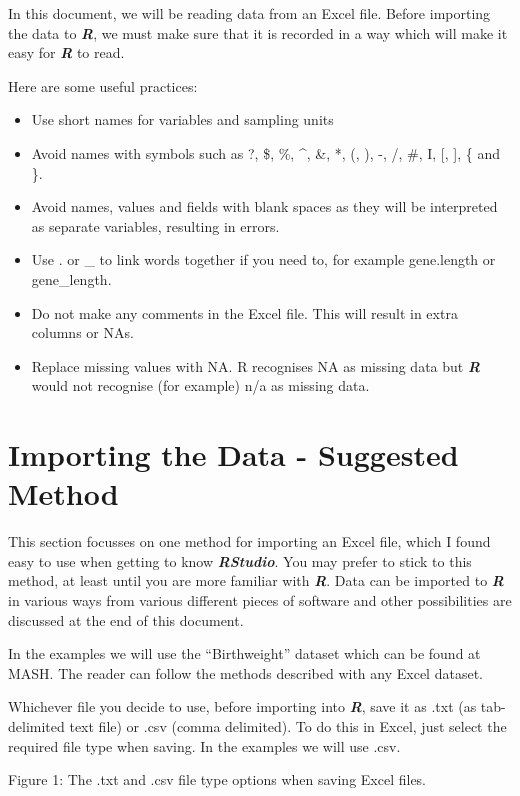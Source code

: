 \documentclass[
]{book}
\providecommand{\tightlist}{%
  \setlength{\itemsep}{0pt}\setlength{\parskip}{0pt}}
\begin{document}
In this document, we will be reading data from an Excel file. Before importing the data to \textbf{\emph{R}}, we must make sure that it is recorded in a way which will make it easy for \textbf{\emph{R}} to read.

Here are some useful practices:

\begin{itemize}
\tightlist
\item
  Use short names for variables and sampling units
\item
  Avoid names with symbols such as ?, \$, \%, \^{}, \&, *, (, ), -, /, \#, I, {[}, {]}, \{ and \}.
\item
  Avoid names, values and fields with blank spaces as they will be interpreted as separate variables, resulting in errors.
\item
  Use . or \_ to link words together if you need to, for example gene.length or gene\_length.
\item
  Do not make any comments in the Excel file. This will result in extra columns or NAs.
\item
  Replace missing values with NA. R recognises NA as missing data but \textbf{\emph{R}} would not recognise (for example) n/a as missing data.
\end{itemize}

\section{Importing the Data - Suggested Method}\label{importing-the-data---suggested-method}

This section focusses on one method for importing an Excel file, which I found easy to use when getting to know \textbf{\emph{RStudio}}. You may prefer to stick to this method, at least until you are more familiar with \textbf{\emph{R}}. Data can be imported to \textbf{\emph{R}} in various ways from various different pieces of software and other possibilities are discussed at the end of this document.

In the examples we will use the ``Birthweight'' dataset which can be found at MASH. The reader can follow the methods described with any Excel dataset.

Whichever file you decide to use, before importing into \textbf{\emph{R}}, save it as .txt (as tab-delimited text file) or .csv (comma delimited). To do this in Excel, just select the required file type when saving. In the examples we will use .csv.

Figure 1: The .txt and .csv file type options when saving Excel files.
\end{document}
